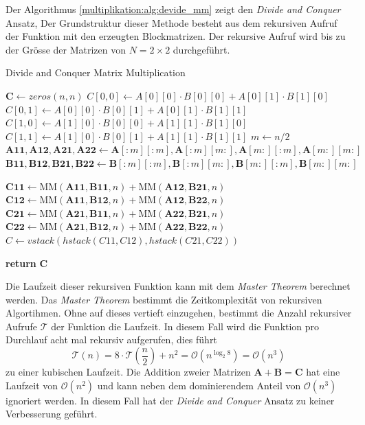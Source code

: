 Der Algorithmus \ref{multiplikation:alg:devide_mm} zeigt den \textit{Divide and Conquer} Ansatz,
Der Grundstruktur dieser Methode besteht aus dem rekursiven Aufruf der Funktion mit den erzeugten Blockmatrizen.
Der rekursive Aufruf wird bis zu der Gr\"osse der Matrizen von $N = 2 \times 2$ durchgef\"uhrt.
\begin{algorithm}\footnotesize\caption{Divide and Conquer Matrix Multiplication}
	\setlength{\lineskip}{7pt}
	\label{multiplikation:alg:devide_mm}
	\begin{algorithmic}
		\State  $ \mathbf{C} \gets zeros(n, n)$
		\State  $C[0, 0] \gets  A[0][0]\cdot B[0][0]+A[0][1]\cdot B[1][0]$
		\State  $C[0, 1] \gets  A[0][0]\cdot B[0][1]+A[0][1]\cdot B[1][1]$
		\State  $C[1, 0] \gets  A[1][0]\cdot B[0][0]+A[1][1]\cdot B[1][0]$
		\State  $C[1, 1] \gets  A[1][0]\cdot B[0][1]+A[1][1]\cdot B[1][1]$
		\Else
		\State  $ m \gets n/2$
		\State $\mathbf{A11}, \mathbf{A12}, \mathbf{A21}, \mathbf{A22} \gets \mathbf{A}[:m][:m], \mathbf{A}[:m][m:], \mathbf{A}[m:][:m], \mathbf{A}[m:][m:]$
		\State $\mathbf{B11}, \mathbf{B12}, \mathbf{B21}, \mathbf{B22} \gets \mathbf{B}[:m][:m], \mathbf{B}[:m][m:], \mathbf{B}[m:][:m], \mathbf{B}[m:][m:]$

		\State $\mathbf{C11} \gets \text{MM}(\mathbf{A11}, \mathbf{B11},n) + \text{MM}(\mathbf{A12}, \mathbf{B21},n)$
		\State $\mathbf{C12} \gets \text{MM}(\mathbf{A11},\mathbf{B12},n) + \text{MM}(\mathbf{A12}, \mathbf{B22},n)$
		\State $\mathbf{C21} \gets \text{MM}(\mathbf{A21}, \mathbf{B11},n) + \text{MM}(\mathbf{A22}, \mathbf{B21},n)$
		\State $\mathbf{C22} \gets \text{MM}(\mathbf{A21}, \mathbf{B12},n) + \text{MM}(\mathbf{A22}, \mathbf{B22},n)$
		\State $  C \gets vstack(hstack(C11, C12), hstack(C21, C22))$

		\EndIf
		\State \textbf{return} $\textbf{C}$

		\EndFunction
	\end{algorithmic}
\end{algorithm}

Die Laufzeit dieser rekursiven Funktion kann mit dem \textit{Master Theorem} \cite{multiplikation:master_theorem} berechnet werden. Das \textit{Master Theorem} bestimmt die Zeitkomplexit\"at von rekursiven Algortihmen.
Ohne auf dieses vertieft einzugehen, bestimmt die Anzahl rekursiver Aufrufe $\mathcal{T} $ der Funktion die Laufzeit.
In diesem Fall wird die Funktion pro Durchlauf acht mal rekursiv aufgerufen, dies f\"uhrt
\begin{equation} \label{multiplikation:eq:laufzeitdac}
	\mathcal{T}(n) =	8 \cdot \mathcal{T}\left (\frac{n}{2}\right ) + n^2  = \mathcal{O}(n^{\log_2 8}) = \mathcal{O}\left (n^{3} \right )
\end{equation}
zu einer kubischen Laufzeit.
Die Addition zweier Matrizen $\mathbf{A} + \mathbf{B} = \mathbf{C}$ hat eine Laufzeit von $\mathcal{O}(n^{2})$ und kann neben dem dominierendem Anteil von $\mathcal{O}(n^{3})$ ignoriert werden.
In diesem Fall hat der \textit{Divide and Conquer} Ansatz zu keiner Verbesserung gef\"uhrt.


